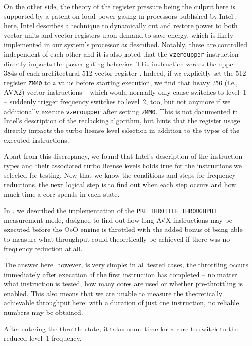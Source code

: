 On the other side, the theory of the register pressure being the culprit here is supported by a patent on local power gating in processors published by Intel \cite{bonen2016performing}: here, Intel describes a technique to dynamically cut and restore power to both vector units and vector registers upon demand to save energy, which is likely implemented in our system's processor as described. Notably, these are controlled independent of each other and it is also noted that the \texttt{vzeroupper} instruction directly impacts the power gating behavior. This instruction zeroes the upper \SI{384}{\bit}s of each architectural \SI{512}{\bit} vector register \cite{intelsdminstructionreference}. Indeed, if we explicitly set the \SI{512}{\bit} register \texttt{ZMM0} to a value before starting execution, we find that heavy \SI{256}{\bit} (i.e., \gls{AVX2}) vector instructions -- which would normally only cause switches to level~1 -- suddenly trigger frequency switches to level~2, too, but not anymore if we additionally execute \texttt{vzeroupper} after setting \texttt{ZMM0}. This is not documented in Intel's description of the reclocking algorithm, but hints that the register usage directly impacts the turbo license level selection in addition to the types of the executed instructions.

Apart from this discrepancy, we found that Intel's description of the instruction types and their associated turbo license levels holds true for the instructions we selected for testing. Now that we know the conditions and steps for frequency reductions, the next logical step is to find out when each step occurs and how much time a core spends in each state.

In , we described the implementation of the \texttt{PRE\_THROTTLE\_THROUGHPUT} measurement mode, designed to find out how long \gls{AVX} instructions may be executed before the \acrlong{OoO} engine is throttled with the added bonus of being able to measure what throughput could theoretically be achieved if there was no frequency reduction at all.

The answer here, however, is very simple: in all tested cases, the throttling occurs immediately after execution of the first instruction has completed -- no matter what instruction is tested, how many cores are used or whether pre-throttling is enabled. This also means that we are unable to measure the theoretically achievable throughput here: with a duration of just one instruction, no reliable numbers may be obtained.

After entering the throttle state, it takes some time for a core to switch to the reduced level~1 frequency.